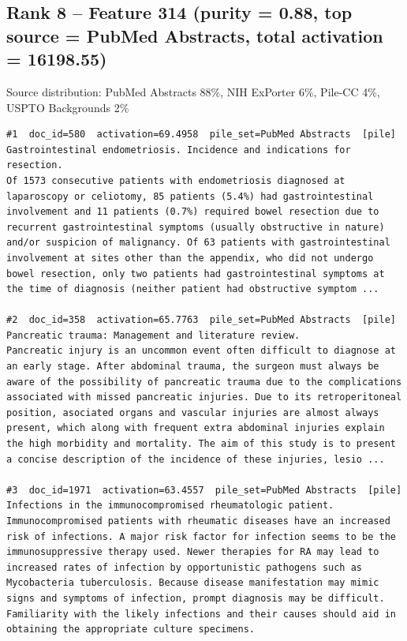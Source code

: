 \subsection*{Rank 8 -- Feature 314 (purity = 0.88, top source = PubMed Abstracts, total activation = 16198.55)}

Source distribution: PubMed Abstracts 88\%, NIH ExPorter 6\%, Pile-CC 4\%, USPTO Backgrounds 2\%

\begin{verbatim}
#1  doc_id=580  activation=69.4958  pile_set=PubMed Abstracts  [pile]
Gastrointestinal endometriosis. Incidence and indications for resection.
Of 1573 consecutive patients with endometriosis diagnosed at laparoscopy or celiotomy, 85 patients (5.4%) had gastrointestinal involvement and 11 patients (0.7%) required bowel resection due to recurrent gastrointestinal symptoms (usually obstructive in nature) and/or suspicion of malignancy. Of 63 patients with gastrointestinal involvement at sites other than the appendix, who did not undergo bowel resection, only two patients had gastrointestinal symptoms at the time of diagnosis (neither patient had obstructive symptom ...

#2  doc_id=358  activation=65.7763  pile_set=PubMed Abstracts  [pile]
Pancreatic trauma: Management and literature review.
Pancreatic injury is an uncommon event often difficult to diagnose at an early stage. After abdominal trauma, the surgeon must always be aware of the possibility of pancreatic trauma due to the complications associated with missed pancreatic injuries. Due to its retroperitoneal position, asociated organs and vascular injuries are almost always present, which along with frequent extra abdominal injuries explain the high morbidity and mortality. The aim of this study is to present a concise description of the incidence of these injuries, lesio ...

#3  doc_id=1971  activation=63.4557  pile_set=PubMed Abstracts  [pile]
Infections in the immunocompromised rheumatologic patient.
Immunocompromised patients with rheumatic diseases have an increased risk of infections. A major risk factor for infection seems to be the immunosuppressive therapy used. Newer therapies for RA may lead to increased rates of infection by opportunistic pathogens such as Mycobacteria tuberculosis. Because disease manifestation may mimic signs and symptoms of infection, prompt diagnosis may be difficult. Familiarity with the likely infections and their causes should aid in obtaining the appropriate culture specimens.


\end{verbatim}
